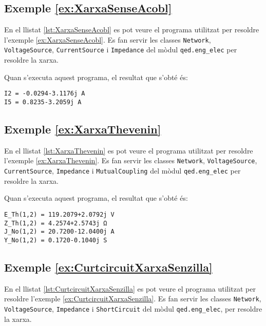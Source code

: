 \hypertarget{exemple:XarxaSenseAcobl}{\subsection{Exemple \ref*{ex:XarxaSenseAcobl} \XarxaSenseAcobl}}
En el llistat \vref{lst:XarxaSenseAcobl} es pot veure el programa utilitzat per resoldre l'exemple \vref{ex:XarxaSenseAcobl}. Es fan servir les classes \texttt{Network},   \texttt{VoltageSource}, \texttt{CurrentSource} i \texttt{Impedance} del mòdul \texttt{qed.eng\_elec} per resoldre la xarxa.


Quan s'executa aquest programa, el resultat que s'obté és:
\lstset{
	language=,
	numbers=none,
	frame=none
}
\begin{lstlisting}
I2 = -0.0294-3.1176j A
I5 = 0.8235-3.2059j A
\end{lstlisting} 

\hypertarget{exemple:XarxaThevenin}{\subsection{Exemple \ref*{ex:XarxaThevenin} \XarxaThevenin}}
En el llistat \vref{lst:XarxaThevenin} es pot veure el programa utilitzat per resoldre l'exemple \vref{ex:XarxaThevenin}. Es fan servir les classes \texttt{Network},  \texttt{VoltageSource}, \texttt{CurrentSource}, \texttt{Impedance} i \texttt{MutualCoupling} del mòdul \texttt{qed.eng\_elec} per resoldre la xarxa.


Quan s'executa aquest programa, el resultat que s'obté és:
\lstset{
	language=,
	numbers=none,
	frame=none
}
\begin{lstlisting}
E_Th(1,2) = 119.2079+2.0792j V
Z_Th(1,2) = 4.2574+2.5743j Ω
J_No(1,2) = 20.7200-12.0400j A
Y_No(1,2) = 0.1720-0.1040j S
\end{lstlisting} 


\hypertarget{exemple:CurtcircuitXarxaSenzilla}{\subsection{Exemple \ref*{ex:CurtcircuitXarxaSenzilla} \CurtcircuitXarxaSenzilla}}
En el llistat \vref{lst:CurtcircuitXarxaSenzilla} es pot veure el programa utilitzat per resoldre l'exemple \vref{ex:CurtcircuitXarxaSenzilla}. Es fan servir les classes \texttt{Network},    \texttt{VoltageSource}, \texttt{Impedance} i \texttt{ShortCircuit} del mòdul \texttt{qed.eng\_elec},  per resoldre la xarxa.

